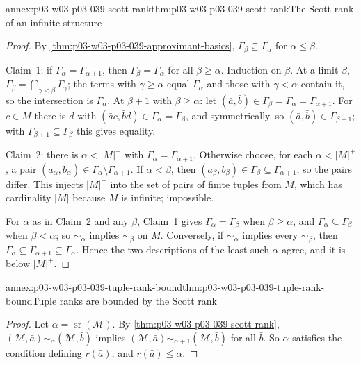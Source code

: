 \begin{annexitem}{annex:p03-w03-p03-039-scott-rank}{thm:p03-w03-p03-039-scott-rank}{The Scott rank of an infinite structure}
\begin{proof}
By \cref{thm:p03-w03-p03-039-approximant-basics}, \(\Gamma_\beta\subseteq\Gamma_\alpha\)
for \(\alpha\le\beta\).

Claim~1: if \(\Gamma_\alpha=\Gamma_{\alpha+1}\), then \(\Gamma_\beta=\Gamma_\alpha\)
for all \(\beta\ge\alpha\). Induction on \(\beta\). At a limit \(\beta\),
\(\Gamma_\beta=\bigcap_{\gamma<\beta}\Gamma_\gamma\); the terms with
\(\gamma\ge\alpha\) equal \(\Gamma_\alpha\) and those with \(\gamma<\alpha\)
contain it, so the intersection is \(\Gamma_\alpha\). At \(\beta+1\) with
\(\beta\ge\alpha\): let \((\bar a,\bar b)\in\Gamma_\beta=\Gamma_\alpha=\Gamma_{\alpha+1}\).
For \(c\in M\) there is \(d\) with \((\bar ac,\bar bd)\in\Gamma_\alpha=\Gamma_\beta\),
and symmetrically, so \((\bar a,\bar b)\in\Gamma_{\beta+1}\); with
\(\Gamma_{\beta+1}\subseteq\Gamma_\beta\) this gives equality.

Claim~2: there is \(\alpha<\lvert M\rvert^+\) with \(\Gamma_\alpha=\Gamma_{\alpha+1}\).
Otherwise choose, for each \(\alpha<\lvert M\rvert^+\), a pair
\((\bar a_\alpha,\bar b_\alpha)\in\Gamma_\alpha\setminus\Gamma_{\alpha+1}\).
If \(\alpha<\beta\), then \((\bar a_\beta,\bar b_\beta)\in\Gamma_\beta\subseteq\Gamma_{\alpha+1}\),
so the pairs differ. This injects \(\lvert M\rvert^+\) into the set of pairs
of finite tuples from \(M\), which has cardinality \(\lvert M\rvert\) because
\(M\) is infinite; impossible.

For \(\alpha\) as in Claim~2 and any \(\beta\), Claim~1 gives
\(\Gamma_\alpha=\Gamma_\beta\) when \(\beta\ge\alpha\), and
\(\Gamma_\alpha\subseteq\Gamma_\beta\) when \(\beta<\alpha\); so
\(\sim_\alpha\) implies \(\sim_\beta\) on \(M\). Conversely, if \(\sim_\alpha\)
implies every \(\sim_\beta\), then \(\Gamma_\alpha\subseteq\Gamma_{\alpha+1}\subseteq\Gamma_\alpha\).
Hence the two descriptions of the least such \(\alpha\) agree, and it is
below \(\lvert M\rvert^+\).
\end{proof}
\end{annexitem}

\begin{annexitem}{annex:p03-w03-p03-039-tuple-rank-bound}{thm:p03-w03-p03-039-tuple-rank-bound}{Tuple ranks are bounded by the Scott rank}
\begin{proof}
Let \(\alpha=\operatorname{sr}(\mathcal M)\). By
\cref{thm:p03-w03-p03-039-scott-rank}, \((\mathcal M,\bar a)\sim_\alpha(\mathcal M,\bar b)\)
implies \((\mathcal M,\bar a)\sim_{\alpha+1}(\mathcal M,\bar b)\) for all
\(\bar b\). So \(\alpha\) satisfies the condition defining \(r(\bar a)\),
and \(r(\bar a)\le\alpha\).
\end{proof}
\end{annexitem}

